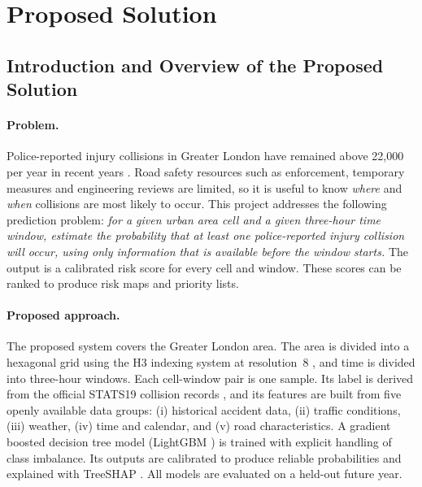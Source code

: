 \section{Proposed Solution}
\label{sec:proposed}

\subsection{Introduction and Overview of the Proposed Solution}
\label{sec:overview}

\paragraph{Problem.}
Police-reported injury collisions in Greater London have remained above 22,000 per year in recent years \cite{tfl2024casualties}. Road safety resources such as enforcement, temporary measures and engineering reviews are limited, so it is useful to know \emph{where} and \emph{when} collisions are most likely to occur. This project addresses the following prediction problem: \emph{for a given urban area cell and a given three-hour time window, estimate the probability that at least one police-reported injury collision will occur, using only information that is available before the window starts.} The output is a calibrated risk score for every cell and window. These scores can be ranked to produce risk maps and priority lists.

\paragraph{Proposed approach.}
The proposed system covers the Greater London area. The area is divided into a hexagonal grid using the H3 indexing system at resolution~8 \cite{h3}, and time is divided into three-hour windows. Each cell-window pair is one sample. Its label is derived from the official STATS19 collision records \cite{dft2025roadsafetydata}, and its features are built from five openly available data groups: (i) historical accident data, (ii) traffic conditions, (iii) weather, (iv) time and calendar, and (v) road characteristics. A gradient boosted decision tree model (LightGBM \cite{ke2017lightgbm}) is trained with explicit handling of class imbalance. Its outputs are calibrated to produce reliable probabilities and explained with TreeSHAP \cite{lundberg2020local}. All models are evaluated on a held-out future year.

